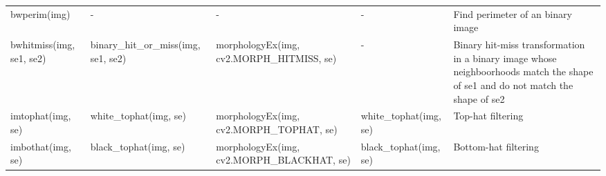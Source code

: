 \documentclass[
10pt,
a4paper,
oneside,
landscape,
plainfootsepline,
plainfootbotline,
]
{scrbook}
\begin{document}
{\begin{tabularx}{\textwidth}{l p{4.8cm} p{4.6cm} l X}
		bwperim(img)             &
		-                        &                                                                                                                                                                                                                                                                  %
		-                        &                                                                                                                                                                                                                                                                  %
		-                        & Find perimeter of an binary image                                                                                                                                                                                                                                \\
		bwhitmiss(img, se1, se2) & binary\_hit\_or\_miss(img, se1, se2)                      & morphologyEx(img, cv2.MORPH\_HITMISS, se)  & -                      & Binary hit-miss transformation in a binary image whose neighboorhoods match the shape of se1 and do not match the shape of se2 \\
		imtophat(img, se)        & white\_tophat(img, se)                                    & morphologyEx(img, cv2.MORPH\_TOPHAT, se)   & white\_tophat(img, se) & Top-hat filtering                                                                                                              \\
		imbothat(img, se)        & black\_tophat(img, se)                                    & morphologyEx(img, cv2.MORPH\_BLACKHAT, se) & black\_tophat(img, se) & Bottom-hat filtering
		\\\hline
	\end{tabularx}}$ $\\
\end{document}
